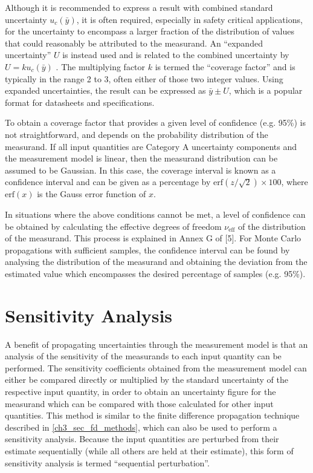 \documentclass[../thesis/thesis.tex]{subfiles}
\begin{document}
\begin{refsection}
Although it is recommended to express a result with combined standard uncertainty $u_c({\bar{y}})$, it is often required, especially in safety critical applications, for the uncertainty to encompass a larger fraction of the distribution of values that could reasonably be attributed to the measurand. An ``expanded uncertainty'' $U$ is instead used and is related to the combined uncertainty by $U=ku_c(\bar{y})$ \cite[6.2.1]{GUM_2008}. The multiplying factor $k$ is termed the ``coverage factor'' and is typically in the range 2 to 3, often either of those two integer values. Using expanded uncertainties, the result can be expressed as $\bar{y} \pm U$, which is a popular format for datasheets and specifications.

To obtain a coverage factor that provides a given level of confidence (e.g. 95\%) is not straightforward, and depends on the probability distribution of the measurand. If all input quantities are Category A uncertainty components and the measurement model is linear, then the measurand distribution can be assumed to be Gaussian. In this case, the coverage interval is known as a confidence interval and can be given as a percentage by  $\text{erf}(z/\sqrt{2})\times 100$, where $\text{erf}(x)$ is the Gauss error function of $x$.
 
In situations where the above conditions cannot be met, a level of confidence can be obtained by calculating the effective degrees of freedom $\nu_\text{eff}$ of the distribution of the measurand. This process is explained in Annex G of [5]. For Monte Carlo propagations with sufficient samples, the confidence interval can be found by analysing the distribution of the measurand and obtaining the deviation from the estimated value which encompasses the desired percentage of samples (e.g. 95\%).

\section{Sensitivity Analysis}

A benefit of propagating uncertainties through the measurement model is that an analysis of the sensitivity of the measurands to each input quantity can be performed. The sensitivity coefficients obtained from the measurement model can either be compared directly or multiplied by the standard uncertainty of the respective input quantity, in order to obtain an uncertainty figure for the measurand which can be compared with those calculated for other input quantities. This method is similar to the finite difference propagation technique described in \ref{ch3_sec_fd_methods}, which can also be used to perform a sensitivity analysis. Because the input quantities are perturbed from their estimate sequentially (while all others are held at their estimate), this form of sensitivity analysis is termed ``sequential perturbation''.


\end{refsection}
\end{document}
